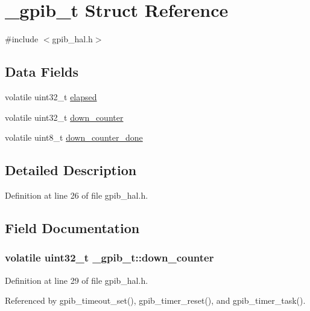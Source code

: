\hypertarget{struct__gpib__t}{}\section{\+\_\+gpib\+\_\+t Struct Reference}
\label{struct__gpib__t}


{\ttfamily \#include $<$gpib\+\_\+hal.\+h$>$}

\subsection*{Data Fields}
\begin{DoxyCompactItemize}
\item 
volatile uint32\+\_\+t \hyperlink{struct__gpib__t_a99a38aef880eb075f625f33d7bac31dd}{elapsed}
\item 
volatile uint32\+\_\+t \hyperlink{struct__gpib__t_a21ed3be06f76b0a5237b5e64bc2e8793}{down\+\_\+counter}
\item 
volatile uint8\+\_\+t \hyperlink{struct__gpib__t_af2622dd8668ecb24c42a2da2d8956538}{down\+\_\+counter\+\_\+done}
\end{DoxyCompactItemize}


\subsection{Detailed Description}


Definition at line 26 of file gpib\+\_\+hal.\+h.



\subsection{Field Documentation}
\subsubsection[{\texorpdfstring{down\+\_\+counter}{down_counter}}]{\setlength{\rightskip}{0pt plus 5cm}volatile uint32\+\_\+t \+\_\+gpib\+\_\+t\+::down\+\_\+counter}\hypertarget{struct__gpib__t_a21ed3be06f76b0a5237b5e64bc2e8793}{}\label{struct__gpib__t_a21ed3be06f76b0a5237b5e64bc2e8793}


Definition at line 29 of file gpib\+\_\+hal.\+h.



Referenced by gpib\+\_\+timeout\+\_\+set(), gpib\+\_\+timer\+\_\+reset(), and gpib\+\_\+timer\+\_\+task().

